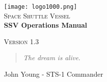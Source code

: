 \documentclass{article}
\begin{document}
\begin{titlepage}

\begin{center}

\texttt{[image: logo1000.png]}\\[1cm]

\textsc{\LARGE Space Shuttle Vessel}\\[1.5cm]

\huge \bfseries SSV Operations Manual\\[0.4cm]

\vfill

\textsc{\Large Version 1.3}\\[0.5cm]

\end{center}
\end{titlepage}


\newpage
\thispagestyle{empty}
\vspace*{\fill}
\begin{quote}
\centering
\textit{The dream is alive.}
\end{quote}
\begin{flushright}
John Young - STS-1 Commander
\end{flushright}
\vspace*{\fill}
\newpage





\newpage
\tableofcontents


\newpage

\newpage

\newpage

\newpage

\newpage

\newpage

\newpage

\newpage

\newpage

\newpage

\newpage

\newpage

\end{document}
